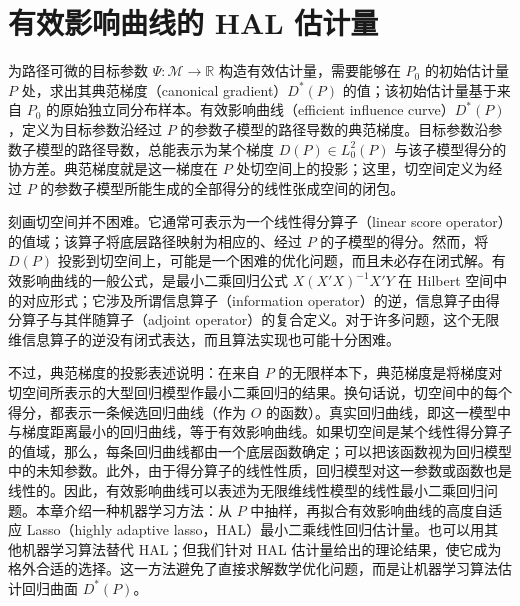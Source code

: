 \chapter{有效影响曲线的 HAL 估计量}
\label{ch:hal-efficient-influence-curve}

\begin{sourcebox}
为路径可微的目标参数 $\Psi:\mathcal M\to\mathbb R$ 构造有效估计量，需要能够在 $P_0$ 的初始估计量 $P$ 处，求出其典范梯度（canonical gradient）$D^*(P)$ 的值；该初始估计量基于来自 $P_0$ 的原始独立同分布样本。有效影响曲线（efficient influence curve）$D^*(P)$，定义为目标参数沿经过 $P$ 的参数子模型的路径导数的典范梯度。目标参数沿参数子模型的路径导数，总能表示为某个梯度 $D(P)\in L_0^2(P)$ 与该子模型得分的协方差。典范梯度就是这一梯度在 $P$ 处切空间上的投影；这里，切空间定义为经过 $P$ 的参数子模型所能生成的全部得分的线性张成空间的闭包。
\end{sourcebox}

刻画切空间并不困难。它通常可表示为一个线性得分算子（linear score operator）的值域；该算子将底层路径映射为相应的、经过 $P$ 的子模型的得分。然而，将 $D(P)$ 投影到切空间上，可能是一个困难的优化问题，而且未必存在闭式解。有效影响曲线的一般公式，是最小二乘回归公式 $X(X'X)^{-1}X'Y$ 在 Hilbert 空间中的对应形式；它涉及所谓信息算子（information operator）的逆，信息算子由得分算子与其伴随算子（adjoint operator）的复合定义。对于许多问题，这个无限维信息算子的逆没有闭式表达，而且算法实现也可能十分困难。

不过，典范梯度的投影表述说明：在来自 $P$ 的无限样本下，典范梯度是将梯度对切空间所表示的大型回归模型作最小二乘回归的结果。换句话说，切空间中的每个得分，都表示一条候选回归曲线（作为 $O$ 的函数）。真实回归曲线，即这一模型中与梯度距离最小的回归曲线，等于有效影响曲线。如果切空间是某个线性得分算子的值域，那么，每条回归曲线都由一个底层函数确定；可以把该函数视为回归模型中的未知参数。此外，由于得分算子的线性性质，回归模型对这一参数或函数也是线性的。因此，有效影响曲线可以表述为无限维线性模型的线性最小二乘回归问题。本章介绍一种机器学习方法：从 $P$ 中抽样，再拟合有效影响曲线的高度自适应 Lasso（highly adaptive lasso，HAL）最小二乘线性回归估计量。也可以用其他机器学习算法替代 HAL；但我们针对 HAL 估计量给出的理论结果，使它成为格外合适的选择。这一方法避免了直接求解数学优化问题，而是让机器学习算法估计回归曲面 $D^*(P)$。

